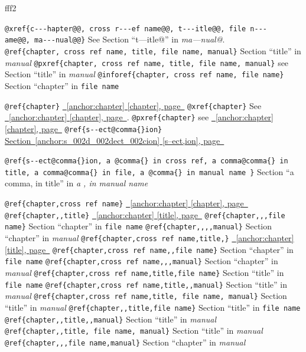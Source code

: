 \documentclass{book}
\newenvironment{Texinfoindented}{\begin{list}{}{}\item\relax}{\end{list}}
\renewcommand{\_}{\Texinfounderscore\discretionary{}{}{}}
\begin{document}
%
\begin{Texinfoindented}
\unskip{\parskip=0pt\noindent}%
fff2
\end{Texinfoindented}


\texttt{@xref\{c{-}{-}{-}hapter@@,\ cross r{-}{-}{-}ef name@@,\ t{-}{-}{-}itle@@,\ file n{-}{-}{-}ame@@,\ ma{-}{-}{-}nual@@\}} See Section ``t---itle@'' in \textsl{ma---nual@}.
\texttt{@ref\{chapter,\ cross ref name,\ title,\ file name,\ manual\}} Section ``title'' in \textsl{manual}
\texttt{@pxref\{chapter,\ cross ref name,\ title,\ file name,\ manual\}} see Section ``title'' in \textsl{manual}
\texttt{@inforef\{chapter,\ cross ref name,\ file name\}} Section ``chapter'' in \texttt{file name}

\texttt{@ref\{chapter\}} \hyperref[anchor:chapter]{\chaptername~\ref*{anchor:chapter} [chapter], page~\pageref*{anchor:chapter}}
\texttt{@xref\{chapter\}} See \hyperref[anchor:chapter]{\chaptername~\ref*{anchor:chapter} [chapter], page~\pageref*{anchor:chapter}}.
\texttt{@pxref\{chapter\}} see \hyperref[anchor:chapter]{\chaptername~\ref*{anchor:chapter} [chapter], page~\pageref*{anchor:chapter}}
\texttt{@ref\{s{-}{-}ect@comma\{\}ion\}} \hyperref[anchor:s_002d_002dect_002cion]{Section~\ref*{anchor:s_002d_002dect_002cion} [s--ect,ion], page~\pageref*{anchor:s_002d_002dect_002cion}}

\texttt{@ref\{s{-}{-}ect@comma\{\}ion,\ a @comma\{\}\ in cross
ref,\ a comma@comma\{\}\ in title,\ a comma@comma\{\}\ in file,\ a @comma\{\}\ in manual name \}}
Section ``a comma, in title'' in \textsl{a , in manual name}

\texttt{@ref\{chapter,cross ref name\}} \hyperref[anchor:chapter]{\chaptername~\ref*{anchor:chapter} [chapter], page~\pageref*{anchor:chapter}}
\texttt{@ref\{chapter{,}{,}title\}} \hyperref[anchor:chapter]{\chaptername~\ref*{anchor:chapter} [title], page~\pageref*{anchor:chapter}}
\texttt{@ref\{chapter{,}{,},file name\}} Section ``chapter'' in \texttt{file name}
\texttt{@ref\{chapter{,}{,}{,}{,}manual\}} Section ``chapter'' in \textsl{manual}
\texttt{@ref\{chapter,cross ref name,title,\}} \hyperref[anchor:chapter]{\chaptername~\ref*{anchor:chapter} [title], page~\pageref*{anchor:chapter}}
\texttt{@ref\{chapter,cross ref name{,}{,}file name\}} Section ``chapter'' in \texttt{file name}
\texttt{@ref\{chapter,cross ref name{,}{,},manual\}} Section ``chapter'' in \textsl{manual}
\texttt{@ref\{chapter,cross ref name,title,file name\}} Section ``title'' in \texttt{file name}
\texttt{@ref\{chapter,cross ref name,title{,}{,}manual\}} Section ``title'' in \textsl{manual}
\texttt{@ref\{chapter,cross ref name,title,\ file name,\ manual\}} Section ``title'' in \textsl{manual}
\texttt{@ref\{chapter{,}{,}title,file name\}} Section ``title'' in \texttt{file name}
\texttt{@ref\{chapter{,}{,}title{,}{,}manual\}} Section ``title'' in \textsl{manual}
\texttt{@ref\{chapter{,}{,}title,\ file name,\ manual\}} Section ``title'' in \textsl{manual}
\texttt{@ref\{chapter{,}{,},file name,manual\}} Section ``chapter'' in \textsl{manual}
\end{document}
